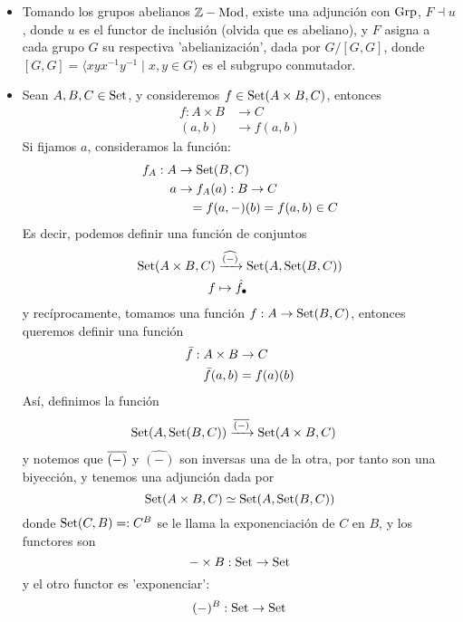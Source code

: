 \begin{exa}
\begin{itemize}
    \item
    Tomando los grupos abelianos $\mathbb Z-\mathrm{Mod}$, existe una adjunción con $\mathrm{Grp}$, $F\dashv u$, donde $u$ es el functor de inclusión (olvida que es abeliano), y $F$ asigna a cada grupo $G$ su respectiva 'abelianización', dada por $G/[G,G]$,
    donde $[G,G]=\langle xyx^{-1}y^{-1}\mid x,y\in G\rangle$
    es el subgrupo conmutador.
    \item Sean $A,B,C\in\mathrm{Set}$, y consideremos $f\in\mathrm{Set}(A\times B, C)$, entonces
    \begin{align*}
        f: A\times B & \to C \\
        (a,b) & \to f(a,b)
    \end{align*}
    Si fijamos $a$, consideramos la función:
    \begin{align*}
        f_A: A & \to \mathrm{Set}(B,C)\\
        a & \to f_A(a): B\to C \\
        &\quad = f(a,-)(b)=f(a,b)\in C
    \end{align*}
    Es decir, podemos definir una función de conjuntos
    \begin{align*}
        \mathrm{Set}(A\times B, C) & \xrightarrow{\widehat{(-)}} \mathrm{Set}(A,\mathrm{Set}(B,C)) \\
        f&\mapsto \hat{f_{\bullet}}
    \end{align*}
    y recíprocamente, tomamos una función $f:A\to\mathrm{Set}(B,C)$, entonces queremos definir una función
    \begin{align*}
        \Bar{f}:A\times B & \to C \\
        \Bar{f}(a,b) &= f(a)(b)
    \end{align*}
    Así, definimos la función 
    \begin{align*}
        \mathrm{Set}(A,\mathrm{Set}(B,C))
        & \xrightarrow{\overline{(-)}}
        \mathrm{Set}(A\times B, C)
    \end{align*}
    y notemos que $\overline{(-)}$ y $\widehat{(-)}$ son inversas una de la otra, por tanto son una biyección, y tenemos una adjunción dada por
    \begin{equation*}
        \mathrm{Set}(A\times B, C)\simeq\mathrm{Set}(A,\mathrm{Set}(B,C))
    \end{equation*}
    donde $\mathrm{Set}(C,B)=:C^B$ se le llama la exponenciación de $C$ en $B$, y los functores son
    \begin{equation*}
        {-}\times B:\mathrm{Set}\to \mathrm{Set}
    \end{equation*}
    y el otro functor es 'exponenciar':
    \begin{equation*}
        ({-})^B:\mathrm{Set}\to \mathrm{Set}
    \end{equation*}
\end{itemize}
\end{exa}
    
